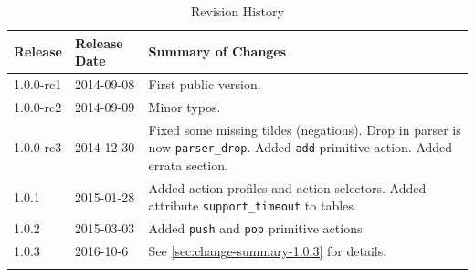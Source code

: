 \documentclass[12pt]{article}
\begin{document}
\begin{table}[H]
\begin{center}
\begin{tabular}{| l | l | p{} |} \hline
\textbf{Release} &
\textbf{Release Date} &
\textbf{Summary of Changes} \\  \hline
1.0.0-rc1 & 2014-09-08 & First public version. \\  \hline
1.0.0-rc2 & 2014-09-09 & Minor typos. \\  \hline
1.0.0-rc3 & 2014-12-30 & Fixed some missing tildes (negations). Drop in parser is now \texttt{parser_drop}. Added \texttt{add} primitive action. Added errata section. \\  \hline
1.0.1 & 2015-01-28 & Added action profiles and action selectors. Added attribute \texttt{support_timeout} to tables. \\  \hline
1.0.2 & 2015-03-03 & Added \texttt{push} and \texttt{pop} primitive actions. \\  \hline
\color{red} 1.0.3 & \color{red} 2016-10-6 & \color{red} See \ref{sec:change-summary-1.0.3} for details. \\ \hline
}
\end{tabular}
\end{center}
\caption{Revision History}
\label{tab:revhistory}
\end{table}

\end{document}
